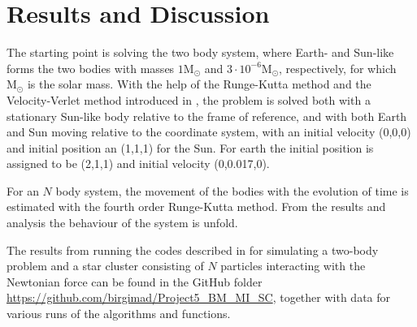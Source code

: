 \chapter{Results and Discussion}
\label{chap:Results}
The starting point is solving the two body system, where Earth- and Sun-like forms the two bodies with masses $1\textrm{M}_{\odot}$ and $3\cdot 10^{-6} \textrm{M}_{\odot}$, respectively, for which $\textrm{M}_{\odot}$ is the solar mass. 
With the help of the Runge-Kutta method and the Velocity-Verlet method introduced in , the problem is solved both with a stationary Sun-like body relative to the frame of reference, and with both Earth and Sun moving relative to the coordinate system, with an initial velocity (0,0,0) and initial position an (1,1,1) for the Sun. 
For earth the initial position is assigned to be (2,1,1) and initial velocity (0,0.017,0). 

For an $N$ body system, the movement of the bodies with the evolution of time is estimated with the fourth order Runge-Kutta method. 
From the results and analysis the behaviour of the system is unfold.

The results from running the codes described in  for simulating a two-body problem and a star cluster consisting of $N$ particles interacting with the Newtonian force can be found in the GitHub folder  \url{https://github.com/birgimad/Project5_BM_MI_SC}, together with data for various runs of the algorithms and functions.
